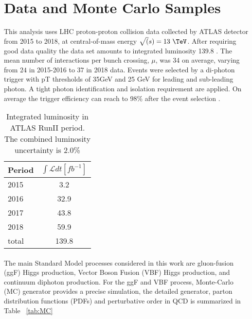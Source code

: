 \section{Data and Monte Carlo Samples}
\label{sec:dataMC}

\paragraph{} This analysis uses LHC proton-proton collision data collected by ATLAS detector from 2015 to 2018, at central-of-mass energy $\sqrt(s)=13~\TeV$. After requiring good data quality the data set amounts to integrated luminosity 139.8 \ifb {}. The mean number of interactions per bunch crossing, $\mu$, was 34 on average, varying from $24$ in 2015-2016 to $37$ in 2018 data.  Events were selected by a di-photon trigger with pT thresholds of 35GeV and 25 GeV for leading and sub-leading photon. A tight photon identification and isolation requirement are applied. On average the trigger efficiency can reach to 98\% after the event selection .

\begin{table}[htbp]
\centering
\begin{tabular}{l|c}
\hline
Period & $\int \mathcal{L} dt [fb^{-1}]$ \\ \hline
2015   & 3.2                   \\
2016   & 32.9                  \\
2017   & 43.8                  \\
2018   & 59.9                  \\ \hline
total  & 139.8                 \\
\hline
\end{tabular}
\caption{Integrated luminosity in ATLAS RunII period. The combined luminosity uncertainty is 2.0\% }
\label{tab:dataLumi}
\end{table}

\paragraph{} The main Standard Model processes considered in this work are gluon-fusion (ggF) Higgs production, Vector Boson Fusion (VBF) Higgs production, and continuum diphoton production. For the ggF and VBF process, Monte-Carlo (MC) generator provides a precise simulation, the detailed generator, parton distribution functions (PDFs) and perturbative order in QCD is summarized in Table ~\ref{tab:MC}  


